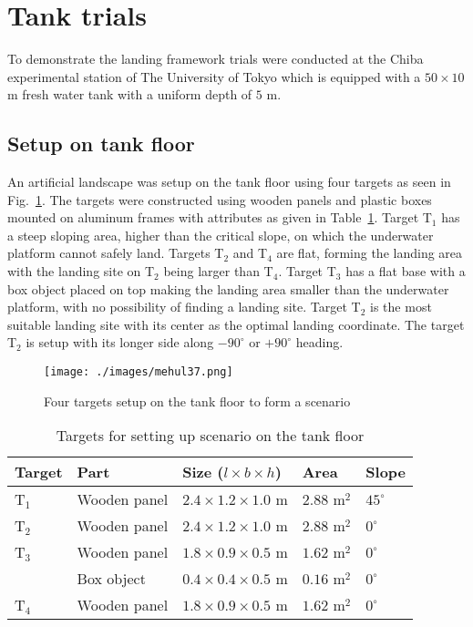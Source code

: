 \section{Tank trials}

To demonstrate the landing framework trials were conducted at the Chiba experimental station of The University of Tokyo which is equipped with a $50 \times 10$ m fresh water tank with a uniform depth of $5$ m. 


\subsection{Setup on tank floor}

An artificial landscape was setup on the tank floor using four targets as seen in Fig.~\ref{f:tank_setup}. The targets were constructed using wooden panels and plastic boxes mounted on aluminum frames with attributes as given in Table~\ref{t:target_specs}. Target T$_1$ has a steep sloping area, higher than the critical slope, on which the underwater platform cannot safely land. Targets T$_2$ and T$_4$ are flat, forming the landing area with the landing site on T$_2$ being larger than T$_4$. Target T$_3$ has a flat base with a box object placed on top making the landing area smaller than the underwater platform, with no possibility of finding a landing site. Target T$_2$ is the most suitable landing site with its center as the optimal landing coordinate. The target T$_2$ is setup with its longer side along $-90^\circ$ or $+90^\circ$ heading. 

\begin{figure}[!ht]
\centering\texttt{[image: ./images/mehul37.png]}
\caption{Four targets setup on the tank floor to form a scenario}
\label{f:tank_setup}
\end{figure}

\begin{table}[!ht]
\centering
\caption{Targets for setting up scenario on the tank floor}
\begin{tabular}{ | p{2cm} p{3cm} p{3cm} p{3cm} p{3cm} |}
\hline
\textbf{Target} & Part & \textbf{Size ($l \times b \times h$)} & \textbf{Area} & \textbf{Slope}\\ 
\hline 
T$_1$ & Wooden panel & ${2.4} \times {1.2} \times {1.0}$ m & ${2.88}$ m$^2$ & $45^\circ$\\
T$_2$ & Wooden panel & ${2.4} \times {1.2} \times {1.0}$ m & ${2.88}$ m$^2$ & $0^\circ$\\
T$_3$ & Wooden panel & ${1.8} \times {0.9} \times {0.5}$ m & ${1.62}$ m$^2$ & $0^\circ$\\
      & Box object & ${0.4} \times {0.4} \times {0.5}$ m & ${0.16}$ m$^2$ & $0^\circ$\\
T$_4$ & Wooden panel & ${1.8} \times {0.9} \times {0.5}$ m & ${1.62}$ m$^2$ & $0^\circ$\\
\hline
\end{tabular}
\label{t:target_specs}
\end{table}


